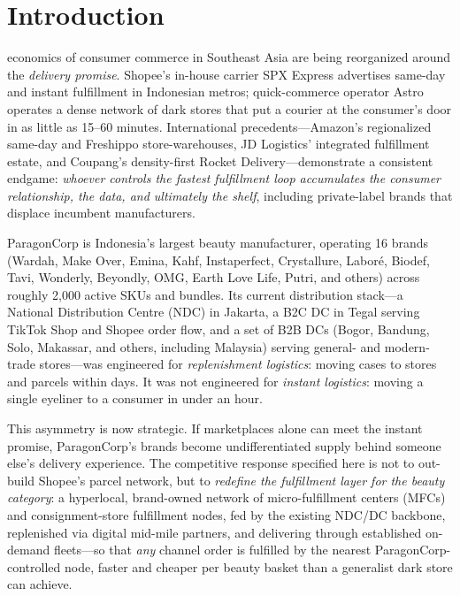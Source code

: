 \section{Introduction}

 economics of consumer commerce in Southeast Asia are being reorganized around the \emph{delivery promise}. Shopee's in-house carrier SPX Express advertises same-day and instant fulfillment in Indonesian metros; quick-commerce operator Astro operates a dense network of dark stores that put a courier at the consumer's door in as little as 15--60 minutes. International precedents---Amazon's regionalized same-day and Freshippo store-warehouses, JD Logistics' integrated fulfillment estate, and Coupang's density-first Rocket Delivery---demonstrate a consistent endgame: \emph{whoever controls the fastest fulfillment loop accumulates the consumer relationship, the data, and ultimately the shelf}, including private-label brands that displace incumbent manufacturers.

ParagonCorp is Indonesia's largest beauty manufacturer, operating 16 brands (Wardah, Make Over, Emina, Kahf, Instaperfect, Crystallure, Labor\'e, Biodef, Tavi, Wonderly, Beyondly, OMG, Earth Love Life, Putri, and others) across roughly 2,000 active SKUs and bundles. Its current distribution stack---a National Distribution Centre (NDC) in Jakarta, a B2C DC in Tegal serving TikTok Shop and Shopee order flow, and a set of B2B DCs (Bogor, Bandung, Solo, Makassar, and others, including Malaysia) serving general- and modern-trade stores---was engineered for \emph{replenishment logistics}: moving cases to stores and parcels within days. It was not engineered for \emph{instant logistics}: moving a single eyeliner to a consumer in under an hour.

This asymmetry is now strategic. If marketplaces alone can meet the instant promise, ParagonCorp's brands become undifferentiated supply behind someone else's delivery experience. The competitive response specified here is not to out-build Shopee's parcel network, but to \emph{redefine the fulfillment layer for the beauty category}: a hyperlocal, brand-owned network of micro-fulfillment centers (MFCs) and consignment-store fulfillment nodes, fed by the existing NDC/DC backbone, replenished via digital mid-mile partners, and delivering through established on-demand fleets---so that \emph{any} channel order is fulfilled by the nearest ParagonCorp-controlled node, faster and cheaper per beauty basket than a generalist dark store can achieve.

